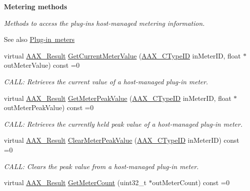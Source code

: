 \begin{Indent}\textbf{ Metering methods}\par
{\em Methods to access the plug-\/in\textquotesingle{}s host-\/managed metering information.

\begin{DoxySeeAlso}{See also}
\mbox{\hyperlink{a00807}{Plug-\/in meters}} 
\end{DoxySeeAlso}
}\begin{DoxyCompactItemize}
\item 
virtual \mbox{\hyperlink{a00392_a4d8f69a697df7f70c3a8e9b8ee130d2f}{A\+A\+X\+\_\+\+Result}} \mbox{\hyperlink{a01789_a13de9cc4bb7fb3848fbe12622c033135}{Get\+Current\+Meter\+Value}} (\mbox{\hyperlink{a00392_ac678f9c1fbcc26315d209f71a147a175}{A\+A\+X\+\_\+\+C\+Type\+ID}} in\+Meter\+ID, float $\ast$out\+Meter\+Value) const =0
\begin{DoxyCompactList}\small\item\em C\+A\+LL\+: Retrieves the current value of a host-\/managed plug-\/in meter. \end{DoxyCompactList}\item 
virtual \mbox{\hyperlink{a00392_a4d8f69a697df7f70c3a8e9b8ee130d2f}{A\+A\+X\+\_\+\+Result}} \mbox{\hyperlink{a01789_a85db3824256005c97689925750103765}{Get\+Meter\+Peak\+Value}} (\mbox{\hyperlink{a00392_ac678f9c1fbcc26315d209f71a147a175}{A\+A\+X\+\_\+\+C\+Type\+ID}} in\+Meter\+ID, float $\ast$out\+Meter\+Peak\+Value) const =0
\begin{DoxyCompactList}\small\item\em C\+A\+LL\+: Retrieves the currently held peak value of a host-\/managed plug-\/in meter. \end{DoxyCompactList}\item 
virtual \mbox{\hyperlink{a00392_a4d8f69a697df7f70c3a8e9b8ee130d2f}{A\+A\+X\+\_\+\+Result}} \mbox{\hyperlink{a01789_aa8fe057d2f53109e75662da0a492fa34}{Clear\+Meter\+Peak\+Value}} (\mbox{\hyperlink{a00392_ac678f9c1fbcc26315d209f71a147a175}{A\+A\+X\+\_\+\+C\+Type\+ID}} in\+Meter\+ID) const =0
\begin{DoxyCompactList}\small\item\em C\+A\+LL\+: Clears the peak value from a host-\/managed plug-\/in meter. \end{DoxyCompactList}\item 
virtual \mbox{\hyperlink{a00392_a4d8f69a697df7f70c3a8e9b8ee130d2f}{A\+A\+X\+\_\+\+Result}} \mbox{\hyperlink{a01789_a3ad8e35bb6b51be934696c39a45157e7}{Get\+Meter\+Count}} (uint32\+\_\+t $\ast$out\+Meter\+Count) const =0

\end{DoxyCompactItemize}
\end{Indent}
